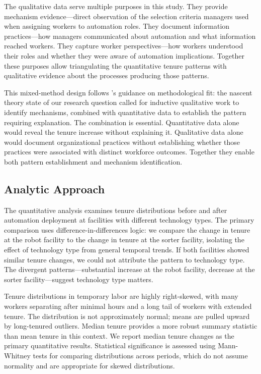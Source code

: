 \documentclass[12pt]{article}
\begin{document}
The qualitative data serve multiple purposes in this study. They provide mechanism evidence---direct observation of the selection criteria managers used when assigning workers to automation roles. They document information practices---how managers communicated about automation and what information reached workers. They capture worker perspectives---how workers understood their roles and whether they were aware of automation implications. Together these purposes allow triangulating the quantitative tenure patterns with qualitative evidence about the processes producing those patterns.

This mixed-method design follows \citet{edmondson2007methodological}'s guidance on methodological fit: the nascent theory state of our research question called for inductive qualitative work to identify mechanisms, combined with quantitative data to establish the pattern requiring explanation. The combination is essential. Quantitative data alone would reveal the tenure increase without explaining it. Qualitative data alone would document organizational practices without establishing whether those practices were associated with distinct workforce outcomes. Together they enable both pattern establishment and mechanism identification.

\subsection{Analytic Approach}

The quantitative analysis examines tenure distributions before and after automation deployment at facilities with different technology types. The primary comparison uses difference-in-differences logic: we compare the change in tenure at the robot facility to the change in tenure at the sorter facility, isolating the effect of technology type from general temporal trends. If both facilities showed similar tenure changes, we could not attribute the pattern to technology type. The divergent patterns---substantial increase at the robot facility, decrease at the sorter facility---suggest technology type matters.

Tenure distributions in temporary labor are highly right-skewed, with many workers separating after minimal hours and a long tail of workers with extended tenure. The distribution is not approximately normal; means are pulled upward by long-tenured outliers. Median tenure provides a more robust summary statistic than mean tenure in this context. We report median tenure changes as the primary quantitative results. Statistical significance is assessed using Mann-Whitney tests for comparing distributions across periods, which do not assume normality and are appropriate for skewed distributions.
\end{document}
